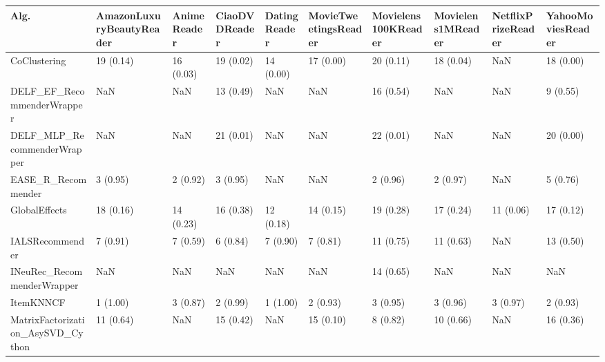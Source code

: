 \begin{tabular}{llllllllll}
\toprule
                               Alg. & AmazonLuxuryBeautyReader & AnimeReader & CiaoDVDReader & DatingReader & MovieTweetingsReader & Movielens100KReader & Movielens1MReader & NetflixPrizeReader & YahooMoviesReader \\
\midrule
                       CoClustering &                19 (0.14) &   16 (0.03) &     19 (0.02) &    14 (0.00) &            17 (0.00) &           20 (0.11) &         18 (0.04) &                NaN &         18 (0.00) \\
         DELF\_EF\_RecommenderWrapper &                      NaN &         NaN &     13 (0.49) &          NaN &                  NaN &           16 (0.54) &               NaN &                NaN &          9 (0.55) \\
        DELF\_MLP\_RecommenderWrapper &                      NaN &         NaN &     21 (0.01) &          NaN &                  NaN &           22 (0.01) &               NaN &                NaN &         20 (0.00) \\
                 EASE\_R\_Recommender &                 3 (0.95) &    2 (0.92) &      3 (0.95) &          NaN &                  NaN &            2 (0.96) &          2 (0.97) &                NaN &          5 (0.76) \\
                      GlobalEffects &                18 (0.16) &   14 (0.23) &     16 (0.38) &    12 (0.18) &            14 (0.15) &           19 (0.28) &         17 (0.24) &          11 (0.06) &         17 (0.12) \\
                    IALSRecommender &                 7 (0.91) &    7 (0.59) &      6 (0.84) &     7 (0.90) &             7 (0.81) &           11 (0.75) &         11 (0.63) &                NaN &         13 (0.50) \\
         INeuRec\_RecommenderWrapper &                      NaN &         NaN &           NaN &          NaN &                  NaN &           14 (0.65) &               NaN &                NaN &               NaN \\
                          ItemKNNCF &                 1 (1.00) &    3 (0.87) &      2 (0.99) &     1 (1.00) &             2 (0.93) &            3 (0.95) &          3 (0.96) &           3 (0.97) &          2 (0.93) \\
  MatrixFactorization\_AsySVD\_Cython &                11 (0.64) &         NaN &     15 (0.42) &          NaN &            15 (0.10) &            8 (0.82) &         10 (0.66) &                NaN &         16 (0.36) \\

\end{tabular}
